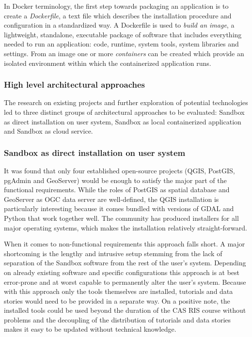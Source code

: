\documentclass[11pt, a4paper, oneside, parskip=full-]{scrartcl}
\begin{document}
In Docker terminology, the first step towards packaging an application is to
create a \emph{Dockerfile}, a text file which describes the installation
procedure and configuration in a standardized way. A Dockerfile is used to
\emph{build an image}, a lightweight, standalone, executable package of software
that includes everything needed to run an application: code, runtime, system
tools, system libraries and settings\cite{dockerimage}. From an image one or
more \emph{containers} can be created which provide an isolated environment
within which the containerized application runs.

\subsubsection{High level architectural approaches}
The research on existing projects and further exploration of potential
technologies led to three distinct groups of architectural approaches to be
evaluated: Sandbox as direct installation on user system, Sandbox as local
containerized application and Sandbox as cloud service.

\subsubsection*{Sandbox as direct installation on user system}
It was found that only four established open-source projects (QGIS\cite{qgis},
PostGIS\cite{postgis}, pgAdmin\cite{pgadmin} and GeoServer\cite{geoserver})
would be enough to satisfy the major part of the functional requirements. While
the roles of PostGIS as spatial database and GeoServer as OGC data server are
well-defined, the QGIS installation is particularly interesting because it comes
bundled with versions of GDAL and Python that work together well. The community
has produced installers for all major operating systems, which makes the
installation relatively straight-forward.

When it comes to non-functional requirements this approach falls short. A major
shortcoming is the lengthy and intrusive setup stemming from the lack of
separation of the Sandbox software from the rest of the user's system. Depending
on already existing software and specific configurations this approach is at
best error-prone and at worst capable to permanently alter the user's system.
Because with this approach only the tools themselves are installed, tutorials
and data stories would need to be provided in a separate way. On a positive
note, the installed tools could be used beyond the duration of the CAS RIS
course without problems and the decoupling of the distribution of tutorials and
data stories makes it easy to be updated without technical knowledge.
\end{document}

